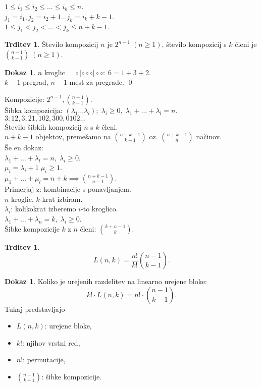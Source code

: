 \documentclass[a4paper, 12pt]{book}
\theoremstyle{definition}
\newtheorem{claim}[counter]{Trditev}
\newtheorem{pro}[counter]{Dokaz}
\theoremstyle{remark}
\begin{document}
$1 \leq i_1 \leq i_2 \leq \dots \leq i_k \leq n$. \\
$j_1 = i_1, j_2 = i_2+1 \dots j_k = i_k+k-1$. \\
$1 \leq j_1 < j_2 < \dots < j_k \leq n+k-1$.
\begin{claim}
  Število kompozicij $n$ je $2^{n-1} \; (n \geq 1)$, število kompozicij s $k$ členi je $\binom{n-1}{k-1} \; (n \geq 1)$.
\end{claim}
\begin{pro}
  $n$ kroglic $\quad \circ | \circ \circ \circ | \circ \circ: \; 6 = 1 + 3 + 2$. \\
  $k-1$ pregrad, $n-1$ mest za pregrade.
  \qed
\end{pro}
%
%
%
Kompozicije: $2^{n-1}, \binom{n-1}{k-1}$. \\
Šibka kompozicija: $(\lambda_1 \dots \lambda_l); \; \lambda_i \geq 0, \; \lambda_1 + \dots + \lambda_l = n$. \\
$3: 12, 3, 21, 102, 300, 0102 \dots$ \\
Število šibkih kompozicij $n$ s $k$ členi. \\
$n+k-1$ objektov, premešamo na $\binom{n+k-1}{k-1}$ oz. $\binom{n+k-1}{n}$ načinov. \\
Še en dokaz: \\
$\lambda_1 + \dots + \lambda_l = n, \; \lambda_i \geq 0$. \\
$\mu_i = \lambda_i + 1 \; \mu_i \geq 1$. \\
$\mu_1 + \dots + \mu_l = n + k \implies \binom{n+k-1}{n-1}$. \\
Primerjaj z: kombinacije s ponavljanjem. \\
$n$ kroglic, $k$-krat izbiram. \\
$\lambda_i$: kolikokrat izberemo $i$-to kroglico. \\
$\lambda_1 + \dots + \lambda_n = k, \; \lambda_i \geq 0$. \\
Šibke kompozicije $k$ z $n$ členi: $\binom{k+n-1}{k}$.
\begin{claim}
  \begin{equation*}
    L(n,k) = \frac{n!}{k!} \binom{n-1}{k-1}.
  \end{equation*}
\end{claim}
\begin{pro}
  Koliko je urejenih razdelitev na linearno urejene bloke:
  \begin{equation*}
    k! \cdot L(n,k) = n! \cdot \binom{n-1}{k-1}.
  \end{equation*}
  Tukaj predstavljajo
  \begin{itemize}
    \item $L(n,k)$: urejene bloke,
    \item $k!$: njihov vrstni red,
    \item $n!$: permutacije,
    \item $\binom{n-1}{k-1}$: šibke kompozicije.
  \end{itemize}
\end{pro}
\end{document}

